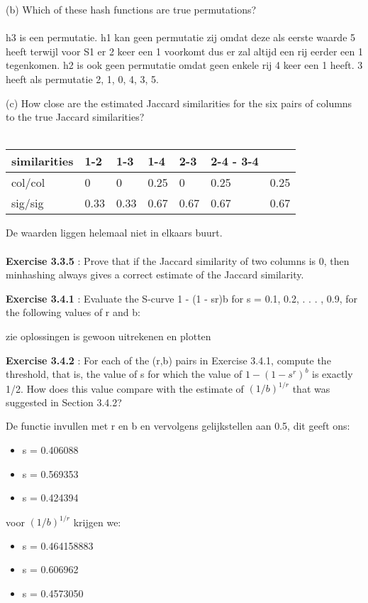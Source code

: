 \documentclass{exam}
\begin{document}
\begin{questions}
(b) Which of these hash functions are true permutations?\\\\
 h3 is een permutatie. h1 kan geen permutatie zij omdat deze als eerste waarde 5 heeft terwijl voor S1 er 2 keer een 1 voorkomt dus er zal altijd een rij eerder een 1 tegenkomen. h2 is ook geen permutatie omdat geen enkele rij 4 keer een 1 heeft. 3 heeft als permutatie 2, 1, 0, 4, 3, 5.

(c) How close are the estimated Jaccard similarities for the six pairs of columns to the true Jaccard similarities?\\\\

\begin{center}
    \begin{tabular}{| l | l | l | l | l | l | l |}
    \hline
	 similarities & 1-2 & 1-3 & 1-4 & 2-3 & 2-4 - 3-4  \\ \hline
     col/col & 0 & 0 & 0.25 & 0 & 0.25 & 0.25 \\ \hline
     sig/sig & 0.33 & 0.33 & 0.67 & 0.67 & 0.67 & 0.67 \\ \hline
    \end{tabular}
\end{center}
De waarden liggen helemaal niet in elkaars buurt.\\\\

\question \textbf{Exercise 3.3.5} : Prove that if the Jaccard similarity of two columns is 0, then minhashing always gives a correct estimate of the Jaccard similarity.

\question \textbf{Exercise 3.4.1} : Evaluate the S-curve 1 - (1 - sr)b for s = 0.1, 0.2, . . . , 0.9, for the following values of r and b:

zie oplossingen is gewoon uitrekenen en plotten

\question \textbf{Exercise 3.4.2} : For each of the (r,b) pairs in Exercise 3.4.1, compute the threshold, that is, the value of s for which the value of $1-(1-s^r)^b$ is exactly 1/2. How does this value compare with the estimate of $(1/b)^{1/r}$ that was suggested in Section 3.4.2?

De functie invullen met r en b en vervolgens gelijkstellen aan 0.5, dit geeft ons:
\begin{itemize}
\item s = 0.406088
\item s = 0.569353
\item s = 0.424394
\end{itemize}

 voor $(1/b)^{1/r}$ krijgen we:
 \begin{itemize}
\item s = 0.464158883
\item s = 0.606962
\item s = 0.4573050
\end{itemize}

\end{questions}
\end{document}
